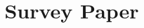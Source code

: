 \documentclass[sigconf,nonacm]{acmart}
\begin{document}
\title{Survey Paper}

\author{}
\renewcommand{\shortauthors}{Survey authors}

\begin{abstract}
\end{abstract}

\keywords{}

\maketitle

\end{document}
